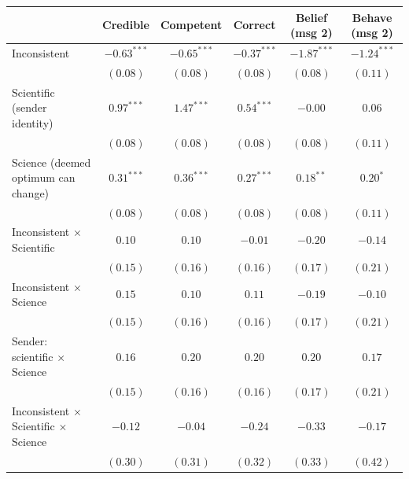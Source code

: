
\begin{table}
\begin{center}
\begin{tabular}{l c c c c c}
\hline
 & Credible & Competent & Correct & Belief (msg 2) & Behave (msg 2) \\
\hline
Inconsistent                                      & $-0.63^{***}$ & $-0.65^{***}$ & $-0.37^{***}$ & $-1.87^{***}$ & $-1.24^{***}$ \\
                                                  & $(0.08)$      & $(0.08)$      & $(0.08)$      & $(0.08)$      & $(0.11)$      \\
Scientific (sender identity)                      & $0.97^{***}$  & $1.47^{***}$  & $0.54^{***}$  & $-0.00$       & $0.06$        \\
                                                  & $(0.08)$      & $(0.08)$      & $(0.08)$      & $(0.08)$      & $(0.11)$      \\
Science (deemed optimum can change)               & $0.31^{***}$  & $0.36^{***}$  & $0.27^{***}$  & $0.18^{**}$   & $0.20^{*}$    \\
                                                  & $(0.08)$      & $(0.08)$      & $(0.08)$      & $(0.08)$      & $(0.11)$      \\
Inconsistent $\times$ Scientific                  & $0.10$        & $0.10$        & $-0.01$       & $-0.20$       & $-0.14$       \\
                                                  & $(0.15)$      & $(0.16)$      & $(0.16)$      & $(0.17)$      & $(0.21)$      \\
Inconsistent $\times$ Science                     & $0.15$        & $0.10$        & $0.11$        & $-0.19$       & $-0.10$       \\
                                                  & $(0.15)$      & $(0.16)$      & $(0.16)$      & $(0.17)$      & $(0.21)$      \\
Sender: scientific $\times$ Science               & $0.16$        & $0.20$        & $0.20$        & $0.20$        & $0.17$        \\
                                                  & $(0.15)$      & $(0.16)$      & $(0.16)$      & $(0.17)$      & $(0.21)$      \\
Inconsistent $\times$ Scientific $\times$ Science & $-0.12$       & $-0.04$       & $-0.24$       & $-0.33$       & $-0.17$       \\
                                                  & $(0.30)$      & $(0.31)$      & $(0.32)$      & $(0.33)$      & $(0.42)$      \\

\end{tabular}
\end{center}
\end{table}
